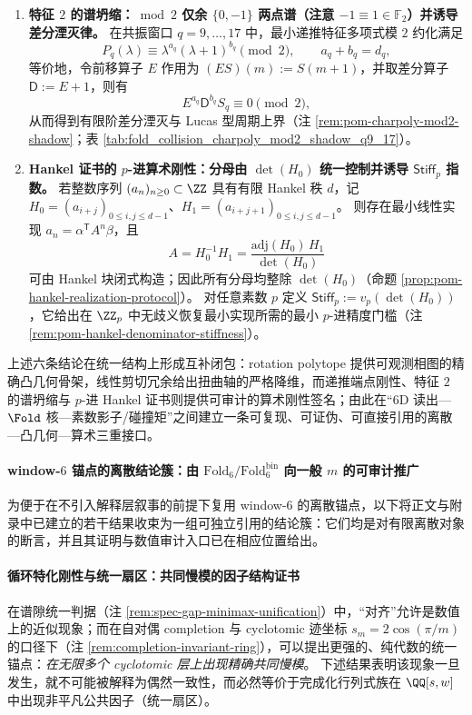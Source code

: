 \begin{theorem}
\begin{enumerate}
  \item \textbf{特征 \(2\) 的谱坍缩：\(\bmod 2\) 仅余 \(\{0,-1\}\) 两点谱（注意 \(-1\equiv 1\in\mathbb{F}_2\)）并诱导差分湮灭律。}
  在共振窗口 \(q=9,\dots,17\) 中，最小递推特征多项式模 \(2\) 约化满足
  \[
  P_q(\lambda)\equiv \lambda^{a_q}(\lambda+1)^{b_q}\pmod 2,\qquad a_q+b_q=d_q,
  \]
  等价地，令前移算子 \(E\) 作用为 \((ES)(m):=S(m+1)\)，并取差分算子 \(\mathsf{D}:=E+1\)，则有
  \[
  E^{a_q}\mathsf{D}^{b_q}S_q\equiv 0\pmod 2,
  \]
  从而得到有限阶差分湮灭与 Lucas 型周期上界（注 \ref{rem:pom-charpoly-mod2-shadow}；表 \ref{tab:fold_collision_charpoly_mod2_shadow_q9_17}）。

  \item \textbf{Hankel 证书的 \(p\)-进算术刚性：分母由 \(\det(H_0)\) 统一控制并诱导 \(\mathsf{Stiff}_p\) 指数。}
  若整数序列 \((a_n)_{n\ge 0}\subset\ZZ\) 具有有限 Hankel 秩 \(d\)，记
  \(H_0=(a_{i+j})_{0\le i,j\le d-1}\)、\(H_1=(a_{i+j+1})_{0\le i,j\le d-1}\)。
  则存在最小线性实现 \(a_n=\alpha^{\mathsf T}A^n\beta\)，且
  \[
  A=H_0^{-1}H_1=\frac{\mathrm{adj}(H_0)\,H_1}{\det(H_0)}
  \]
  可由 Hankel 块闭式构造；因此所有分母均整除 \(\det(H_0)\)（命题 \ref{prop:pom-hankel-realization-protocol}）。
  对任意素数 \(p\) 定义
  \(
  \mathsf{Stiff}_p:=v_p(\det(H_0))
  \)，它给出在 \(\ZZ_p\) 中无歧义恢复最小实现所需的最小 \(p\)-进精度门槛（注 \ref{rem:pom-hankel-denominator-stiffness}）。
\end{enumerate}
上述六条结论在统一结构上形成互补闭包：rotation polytope 提供可观测相图的精确凸几何骨架，线性剪切冗余给出扭曲轴的严格降维，而递推端点刚性、特征 \(2\) 的谱坍缩与 \(p\)-进 Hankel 证书则提供可审计的算术刚性签名；由此在“6D 读出—\(\Fold\) 核—素数影子/碰撞矩”之间建立一条可复现、可证伪、可直接引用的离散—凸几何—算术三重接口。
\end{theorem}

\paragraph{window-\(6\) 锚点的离散结论簇：由 \texorpdfstring{$\mathrm{Fold}_6/\mathrm{Fold}^{\mathrm{bin}}_6$}{Fold6/Foldbin6} 向一般 \texorpdfstring{$m$}{m} 的可审计推广}
为便于在不引入解释层叙事的前提下复用 window-\(6\) 的离散锚点，以下将正文与附录中已建立的若干结果收束为一组可独立引用的结论簇：它们均是对有限离散对象的断言，并且其证明与数值审计入口已在相应位置给出。



\paragraph{循环特化刚性与统一扇区：共同慢模的因子结构证书}
在谱隙统一判据（注 \ref{rem:spec-gap-minimax-unification}）中，“对齐”允许是数值上的近似现象；而在自对偶 completion 与 cyclotomic 迹坐标 \(s_m=2\cos(\pi/m)\) 的口径下（注 \ref{rem:completion-invariant-ring}），可以提出更强的、纯代数的统一锚点：\emph{在无限多个 cyclotomic 层上出现精确共同慢模}。
下述结果表明该现象一旦发生，就不可能被解释为偶然一致性，而必然等价于完成化行列式族在 \(\QQ[s,w]\) 中出现非平凡公共因子（统一扇区）。

